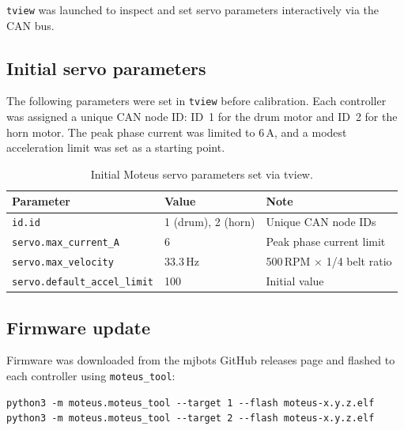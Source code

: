 \noindent
\texttt{tview} was launched to inspect and set servo parameters interactively via the CAN bus.

\subsection{Initial servo parameters}

The following parameters were set in \texttt{tview} before calibration.
Each controller was assigned a unique CAN node ID: ID~1 for the drum motor and ID~2 for the
horn motor.
The peak phase current was limited to 6\,A, and a modest acceleration limit was set as a
starting point.

\begin{table}[H]
	\caption{Initial Moteus servo parameters set via tview.}
	\label{tab:moteus-params}
	\begin{center}
		\begin{tabular}[c]{l l l}
			\hline
			\textbf{Parameter}                   & \textbf{Value}     & \textbf{Note}                    \\
			\hline
			\texttt{id.id}                       & 1 (drum), 2 (horn) & Unique CAN node IDs              \\
			\texttt{servo.max\_current\_A}       & 6                  & Peak phase current limit         \\
			\texttt{servo.max\_velocity}         & 33.3\,Hz           & 500\,RPM $\times$ 1/4 belt ratio \\
			\texttt{servo.default\_accel\_limit} & 100                & Initial value                    \\
			\hline
		\end{tabular}
	\end{center}
\end{table}

\subsection{Firmware update}

Firmware was downloaded from the mjbots GitHub releases page and flashed to each controller
using \texttt{moteus\_tool}:

\begin{listing}[H]
	\begin{verbatim}
python3 -m moteus.moteus_tool --target 1 --flash moteus-x.y.z.elf
python3 -m moteus.moteus_tool --target 2 --flash moteus-x.y.z.elf
\end{verbatim}
	\caption{Flashing firmware to the drum (ID~1) and horn (ID~2) controllers.}
	\label{lst:moteus-flash}
\end{listing}


